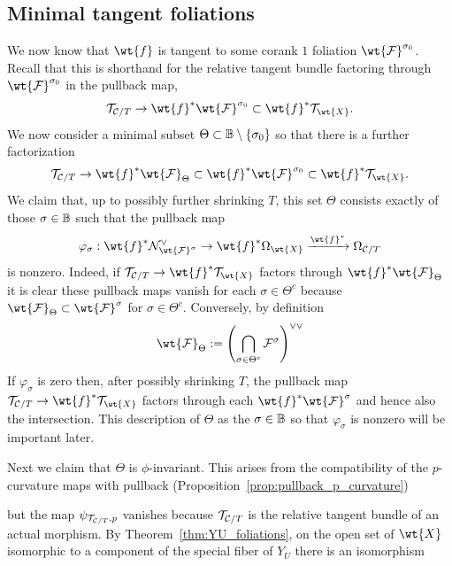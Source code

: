 \documentclass[main.tex]{subfiles}
\begin{document}
{\subsection{Minimal tangent foliations} \label{section:minimal_tangent_foliations}

We now know that $\wt{f}$ is tangent to some corank $1$ foliation $\wt{\F}^{\sigma_0}$. Recall that this is shorthand for the relative tangent bundle factoring through $\wt{\F}^{\sigma_0}$ in the pullback map,
\[ \cT_{\cC/T} \to \wt{f}^* \wt{\F}^{\sigma_0} \subset \wt{f}^* \cT_{\wt{X}}. \]
We now consider a minimal subset $\Theta \subset \mathbb{B} \setminus \{ \sigma_0 \}$ so that there is a further factorization
\[ \cT_{\cC/T} \to \wt{f}^* \wt{\F}_{\Theta} \subset \wt{f}^* \wt{\F}^{\sigma_0} \subset \wt{f}^* \cT_{\wt{X}}. \]
We claim that, up to possibly further shrinking $T$, this set $\Theta$ consists exactly of those $\sigma \in \mathbb{B}$ such that the pullback map
\[ \varphi_{\sigma} : \wt{f}^* \cN^{\vee}_{\wt{\F}^{\sigma}} \to \wt{f}^* \Omega_{\wt{X}} \xrightarrow{\wt{f}^*}  \Omega_{\cC/T} \]
is nonzero. Indeed, if $\cT_{\cC/T} \to \wt{f}^* \cT_{\wt{X}}$ factors through $\wt{f}^* \wt{\F}_{\Theta}$ it is clear these pullback maps vanish for each $\sigma \in \Theta^c$ because $\wt{\F}_{\Theta} \subset \wt{\F}^{\sigma}$ for $\sigma \in \Theta^c$. Conversely, by definition
\[ \wt{\F}_{\Theta} := \left( \bigcap_{\sigma \in \Theta^c} \F^{\sigma} \right)^{\vee \vee} \]
If $\varphi_{\sigma}$ is zero then, after possibly shrinking $T$, the pullback map $\cT_{\cC/T} \to \wt{f}^* \cT_{\wt{X}}$ factors through each $\wt{f}^* \wt{\F}^{\sigma}$ and hence also the intersection. This description of $\Theta$ as the $\sigma \in \mathbb{B}$ so that $\varphi_{\sigma}$ is nonzero will be important later. 
\par 
Next we claim that $\Theta$ is $\phi$-invariant. This arises from the compatibility of the $p$-curvature maps with pullback (Proposition~\ref{prop:pullback_p_curvature})
\begin{center}
\end{center}
but the map $\psi_{\mathcal{T}_{\mathcal{C}/T}, p}$ vanishes because $\mathcal{T}_{\mathcal{C}/T}$ is the relative tangent bundle of an actual morphism. By Theorem~\ref{thm:YU_foliations}, on the open set of $\wt{X}$ isomorphic to a component of the special fiber of $Y_U$ there is an isomorphism
}
\end{document}
